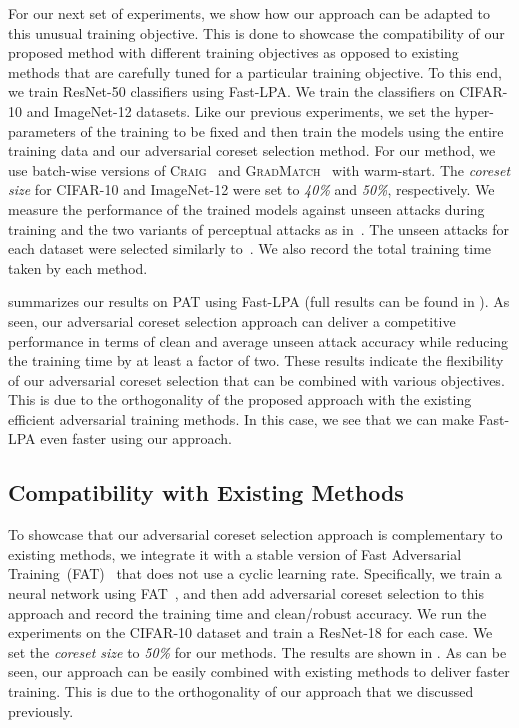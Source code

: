 \documentclass[runningheads]{llncs}
\begin{document}
For our next set of experiments, we show how our approach can be adapted to this unusual training objective.
This is done to showcase the compatibility of our proposed method with different training objectives as opposed to existing methods that are carefully tuned for a particular training objective.
To this end, we train ResNet-50 classifiers using Fast-LPA.
We train the classifiers on CIFAR-10 and ImageNet-12 datasets.
Like our previous experiments, we set the hyper-parameters of the training to be fixed and then train the models using the entire training data and our adversarial coreset selection method.
For our method, we use batch-wise versions of \textsc{Craig}~\cite{mirzasoleiman2020craig} and \textsc{GradMatch}~\cite{killamsetty2021gradmatch} with warm-start.
The \textit{coreset size} for CIFAR-10 and ImageNet-12 were set to \textit{40\%} and \textit{50\%}, respectively.
We measure the performance of the trained models against unseen attacks during training and the two variants of perceptual attacks as in~\cite{laidlaw2021pat}.
The unseen attacks for each dataset were selected similarly to~\cite{laidlaw2021pat}.
We also record the total training time taken by each method.

 summarizes our results on PAT using Fast-LPA (full results can be found in ).
As seen, our adversarial coreset selection approach can deliver a competitive performance in terms of clean and average unseen attack accuracy while reducing the training time by at least a factor of two.
These results indicate the flexibility of our adversarial coreset selection that can be combined with various objectives.
This is due to the orthogonality of the proposed approach with the existing efficient adversarial training methods.
In this case, we see that we can make Fast-LPA even faster using our approach.

\subsection{Compatibility with Existing Methods}
To showcase that our adversarial coreset selection approach is complementary to existing methods, we integrate it with a stable version of Fast Adversarial Training~(FAT)~\cite{wong2020fast} that does not use a cyclic learning rate.
Specifically, we train a neural network using FAT~\cite{wong2020fast}, and then add adversarial coreset selection to this approach and record the training time and clean/robust accuracy.
We run the experiments on the CIFAR-10 dataset and train a ResNet-18 for each case.
We set the \textit{coreset size} to \textit{50\%} for our methods.
The results are shown in .
As can be seen, our approach can be easily combined with existing methods to deliver faster training.
This is due to the orthogonality of our approach that we discussed previously.
\end{document}
